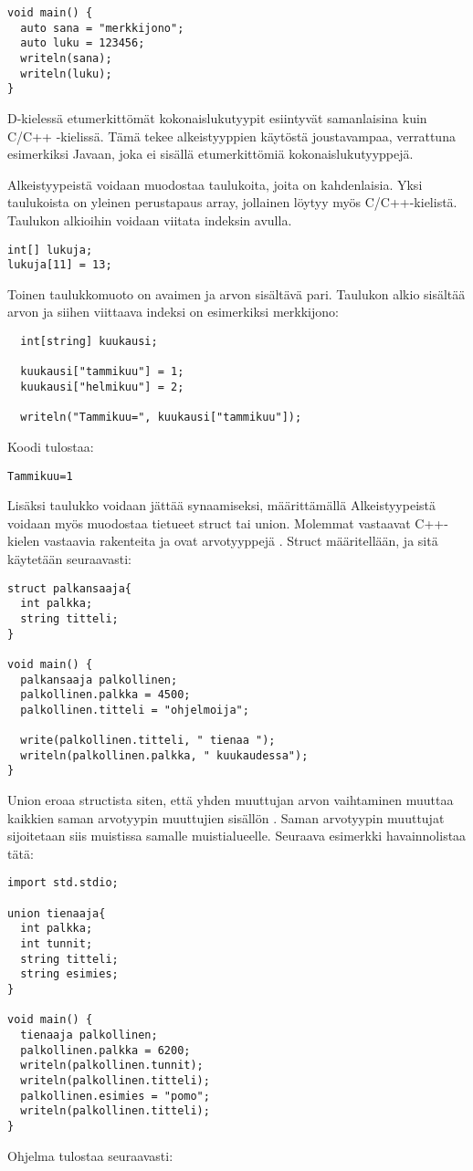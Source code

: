 \documentclass[11pt,oneside,a4paper]{article}
\begin{document}
\begin{verbatim}
void main() {
  auto sana = "merkkijono";
  auto luku = 123456;
  writeln(sana);
  writeln(luku);
}
\end{verbatim}

D-kielessä etumerkittömät kokonaislukutyypit esiintyvät samanlaisina kuin C/C++ -kielissä. Tämä tekee alkeistyyppien käytöstä joustavampaa, verrattuna esimerkiksi Javaan, joka ei sisällä etumerkittömiä kokonaislukutyyppejä.

Alkeistyypeistä voidaan muodostaa taulukoita, joita on kahdenlaisia. Yksi taulukoista on yleinen perustapaus array, jollainen löytyy myös C/C++-kielistä. Taulukon alkioihin voidaan viitata indeksin avulla.
\begin{verbatim}
int[] lukuja;
lukuja[11] = 13;
\end{verbatim}

Toinen taulukkomuoto on avaimen ja arvon sisältävä pari. Taulukon alkio sisältää arvon ja siihen viittaava indeksi on esimerkiksi merkkijono: 
\begin{verbatim}
  int[string] kuukausi;
  
  kuukausi["tammikuu"] = 1;
  kuukausi["helmikuu"] = 2;
  
  writeln("Tammikuu=", kuukausi["tammikuu"]);
\end{verbatim}
Koodi tulostaa:
\begin{verbatim}
Tammikuu=1
\end{verbatim}

Lisäksi taulukko voidaan jättää synaamiseksi, määrittämällä 
Alkeistyypeistä voidaan myös muodostaa tietueet struct tai union. Molemmat vastaavat C++-kielen vastaavia rakenteita ja ovat arvotyyppejä \cite{DLA13}. Struct määritellään, ja sitä käytetään seuraavasti:

\begin{verbatim}
struct palkansaaja{
  int palkka;
  string titteli;
}

void main() {
  palkansaaja palkollinen;
  palkollinen.palkka = 4500;
  palkollinen.titteli = "ohjelmoija";

  write(palkollinen.titteli, " tienaa ");
  writeln(palkollinen.palkka, " kuukaudessa");
}
\end{verbatim}

Union eroaa structista siten, että yhden muuttujan arvon vaihtaminen muuttaa kaikkien saman arvotyypin muuttujien sisällön \cite{ALE10}. Saman arvotyypin muuttujat sijoitetaan siis muistissa samalle muistialueelle. Seuraava esimerkki havainnolistaa tätä:
\begin{verbatim}
import std.stdio;

union tienaaja{
  int palkka;
  int tunnit;
  string titteli;
  string esimies;
}

void main() {
  tienaaja palkollinen;
  palkollinen.palkka = 6200;
  writeln(palkollinen.tunnit);
  writeln(palkollinen.titteli);
  palkollinen.esimies = "pomo";
  writeln(palkollinen.titteli);
}
\end{verbatim}
Ohjelma tulostaa seuraavasti:
\end{document}
